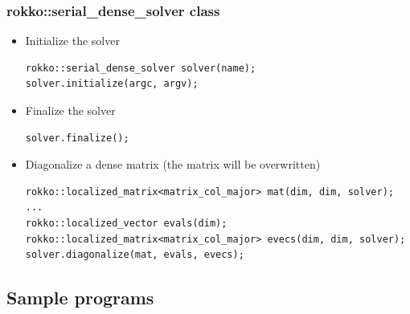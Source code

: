 \begin{frame}[c,fragile]
  \frametitle{rokko::serial\_dense\_solver class}
  \begin{itemize}
  \item Initialize the solver
\begin{lstlisting}
rokko::serial_dense_solver solver(name);
solver.initialize(argc, argv);
\end{lstlisting}
  \item Finalize the solver
\begin{lstlisting}
solver.finalize();
\end{lstlisting}
  \item Diagonalize a dense matrix (the matrix will be overwritten)
\begin{lstlisting}
rokko::localized_matrix<matrix_col_major> mat(dim, dim, solver);
...
rokko::localized_vector evals(dim);
rokko::localized_matrix<matrix_col_major> evecs(dim, dim, solver);
solver.diagonalize(mat, evals, evecs);
\end{lstlisting}
  \end{itemize}
\end{frame}

\subsection{Sample programs}

